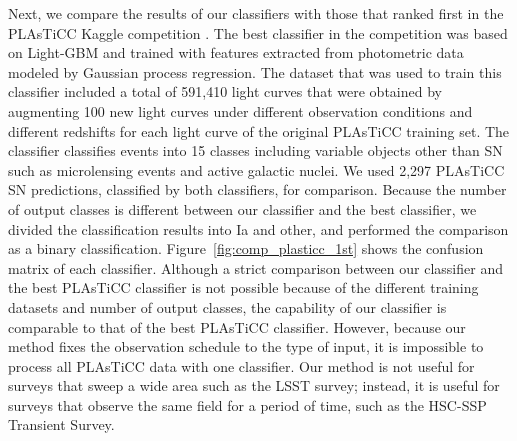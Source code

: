 \documentclass[proof]{pasj01}
\providecommand{\DIFadd}[1]{{\protect\color{blue} \sf #1}} %
\providecommand{\DIFaddbegin}{\protect\color{blue}} %
\providecommand{\DIFaddend}{\protect\color{black}} %
\newcommand{\DIFaddincludegraphics}[2][]{{\color{blue}\fbox{\DIFOincludegraphics[#1]{#2}}}} %
\DeclareRobustCommand{\DIFaddbegin}{\DIFOaddbegin \let\includegraphics\DIFaddincludegraphics} %
\DeclareRobustCommand{\DIFaddend}{\DIFOaddend \let\includegraphics\DIFOincludegraphics} %
\begin{document}
Next, we compare the results of our classifiers with those that ranked first in the PLAsTiCC Kaggle competition \citep{malz19a}.
The best classifier in the competition \citep{boone19a} was based on Light-GBM and trained with features extracted from photometric data modeled by Gaussian process regression.
The dataset that was used to train this classifier included a total of 591,410 light curves that were obtained by augmenting 100 new light curves under different observation conditions and \DIFaddbegin \DIFadd{by using }\DIFaddend different redshifts for each light curve of the original PLAsTiCC training set.
The classifier classifies events into 15 classes including variable objects other than SN such as microlensing events and active galactic nuclei.
We used 2,297 PLAsTiCC SN predictions, classified by both classifiers, for comparison.
Because the number of output classes is different between our classifier and the best classifier, we divided the classification results into Ia and other, and performed the comparison as a binary classification.
Figure\ \ref{fig:comp_plasticc_1st} shows the confusion matrix of each classifier.
Although a strict comparison between our classifier and the best PLAsTiCC classifier is not possible because of the different training datasets and number of output classes, the capability of our classifier is comparable to that of the best PLAsTiCC classifier.
However, because our method fixes the observation schedule to the type of input, it is impossible to process all PLAsTiCC data with one classifier.
Our method is not useful for surveys that sweep a wide area such as the LSST survey; instead, it is useful for surveys that observe the same field for a period of time, such as the HSC-SSP Transient Survey.
%
\end{document}
